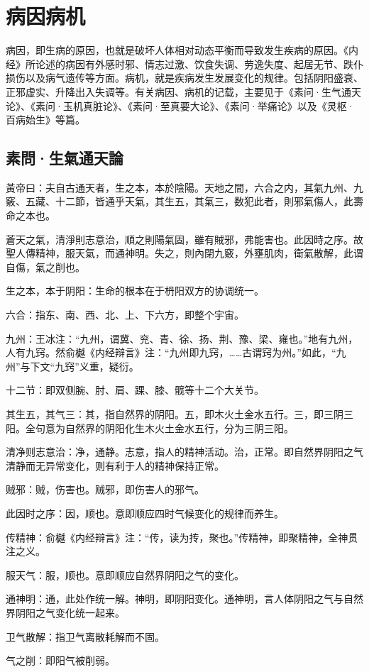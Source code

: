 \documentclass[draft,12pt]{ctexbook}
\begin{document}
\pagestyle{main2}
\fi
\chapter{病因病机}%

病因，即生病的原因，也就是破坏人体相对动态平衡而导致发生疾病的原因。《内经》所论述的病因有外感时邪、情志过激、饮食失调、劳逸失度、起居无节、跌仆损伤以及病气遗传等方面。病机，就是疾病发生发展变化的规律。包括阴阳盛衰、正邪虚实、升降出入失调等。有关病因、病机的记载，主要见于《素问·生气通天论》、《素问·玉机真脏论》、《素问·至真要大论》、《素问·举痛论》以及《灵枢·百病始生》等篇。

\section{素問·生氣通天論}%


\begin{yuanwen}
黃帝曰：夫自古通天者，生之本，本於陰陽。天地之間，六合之内，其氣九州、九竅、五藏、十二節，皆通乎天氣，其生五，其氣三，数犯此者，則邪氣傷人，此壽命之本也。

蒼天之氣，清淨則志意治，順之則陽氣固，雖有賊邪，弗能害也。此因時之序。故聖人傳精神，服天氣，而通神明。失之，則內閉九竅，外壅肌肉，衛氣散解，此谓自傷，氣之削也。
\end{yuanwen}


\begin{jiaozhu}
	\item 生之本，本于阴阳：生命的根本在于枬阳双方的协调统一。
	\item 六合：指东、南、西、北、上、下六方，即整个宇宙。
	\item 九州：王冰注：“九州，谓冀、兖、青、徐、扬、荆、豫、梁、雍也。”地有九州，人有九窍。然俞樾《内经辩言》注：“九州即九窍，……古谓窍为州。”如此，“九州”与下文“九窍”义重，疑衍。
	\item 十二节：即双侧腕、肘、肩、踝、膝、髋等十二个大关节。
	\item 其生五，其气三：其，指自然界的阴阳。五，即木火土金水五行。三，即三阴三阳。全句意为自然界的阴阳化生木火土金水五行，分为三阴三阳。
	\item 清净则志意治：净，通静。志意，指人的精神活动。治，正常。即自然界阴阳之气清静而无异常变化，则有利于人的精神保持正常。
	\item 贼邪：贼，伤害也。贼邪，即伤害人的邪气。
	\item 此因时之序：因，顺也。意即顺应四时气候变化的规律而养生。
	\item 传精神：俞樾《内经辩言》注：“传，读为抟，聚也。”传精神，即聚精神，全神贯注之义。
	\item 服天气：服，顺也。意即顺应自然界阴阳之气的变化。
	\item 通神明：通，此处作统一解。神明，即阴阳变化。通神明，言人体阴阳之气与自然界阴阳之气变化统一起来。
	\item 卫气散解：指卫气离散耗解而不固。
	\item 气之削：即阳气被削弱。
\end{jiaozhu}
\end{document}
